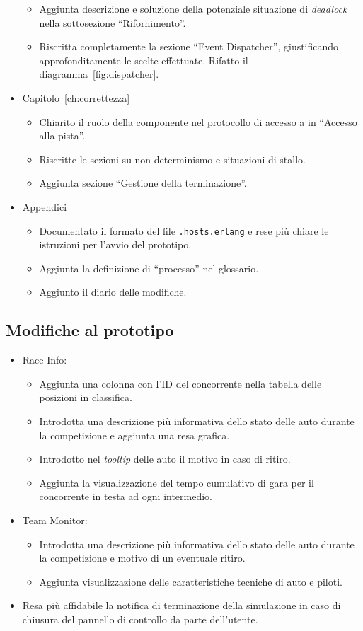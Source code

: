 \begin{itemize}
\begin{itemize}
	\item Aggiunta descrizione e soluzione della potenziale situazione di \textit{deadlock} nella sottosezione ``Rifornimento''.
	\item Riscritta completamente la sezione ``Event Dispatcher'', giustificando approfonditamente le scelte effettuate. Rifatto il diagramma~\ref{fig:dispatcher}.
	\end{itemize}
\item Capitolo~\ref{ch:correttezza}
	\begin{itemize}
	\item Chiarito il ruolo della componente \sched{} nel protocollo di accesso a \track{} in ``Accesso alla pista''.
	\item Riscritte le sezioni su non determinismo e situazioni di stallo.
	\item Aggiunta sezione ``Gestione della terminazione''.
	\end{itemize}
\item Appendici
	\begin{itemize}
	\item Documentato il formato del file \texttt{.hosts.erlang} e rese più chiare le istruzioni per l'avvio del prototipo.
	\item Aggiunta la definizione di ``processo'' nel glossario.
	\item Aggiunto il diario delle modifiche.
	\end{itemize}
\end{itemize}

\subsection*{Modifiche al prototipo}
\begin{itemize}
\item Race Info:
	\begin{itemize}
	\item Aggiunta una colonna con l'ID del concorrente nella tabella delle posizioni in classifica.
	\item Introdotta una descrizione più informativa dello stato delle auto durante la competizione e aggiunta una resa grafica.
	\item Introdotto nel \textit{tooltip} delle auto il motivo in caso di ritiro.
	\item Aggiunta la visualizzazione del tempo cumulativo di gara per il concorrente in testa ad ogni intermedio.
	\end{itemize}
\item Team Monitor:
	\begin{itemize}
	\item Introdotta una descrizione più informativa dello stato delle auto durante la competizione e motivo di un eventuale ritiro.
	\item Aggiunta visualizzazione delle caratteristiche tecniche di auto e piloti.
	\end{itemize}
\item Resa più affidabile la notifica di terminazione della simulazione in caso di chiusura del pannello di controllo da parte dell'utente.
\end{itemize}

